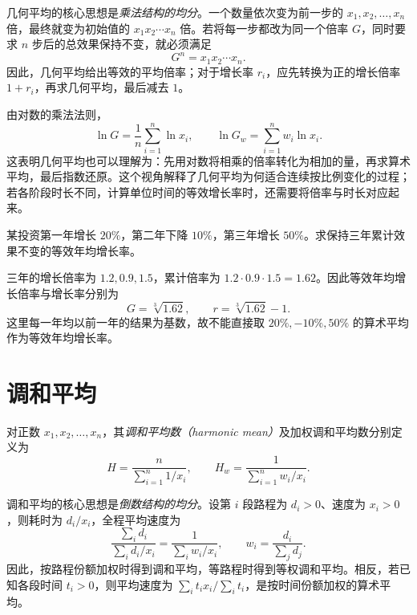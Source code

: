 \documentclass[UTF8,12pt,a4paper,fontset=fandol]{ctexart}
\begin{document}
几何平均的核心思想是\emph{乘法结构的均分}。一个数量依次变为前一步的 $x_1,x_2,\ldots,x_n$ 倍，最终就变为初始值的 $x_1x_2\cdots x_n$ 倍。若将每一步都改为同一个倍率 $G$，同时要求 $n$ 步后的总效果保持不变，就必须满足
\[
  G^n=x_1x_2\cdots x_n.
\]
因此，几何平均给出等效的平均倍率；对于增长率 $r_i$，应先转换为正的增长倍率 $1+r_i$，再求几何平均，最后减去 $1$。

由对数的乘法法则，
\begin{equation}
\label{eq:means-geometric-log}
  \ln G=\frac{1}{n}\sum_{i=1}^n\ln x_i,
  \qquad \ln G_w=\sum_{i=1}^n w_i\ln x_i.
\end{equation}
这表明几何平均也可以理解为：先用对数将相乘的倍率转化为相加的量，再求算术平均，最后指数还原。这个视角解释了几何平均为何适合连续按比例变化的过程；若各阶段时长不同，计算单位时间的等效增长率时，还需要将倍率与时长对应起来。

\begin{example}
某投资第一年增长 $20\%$，第二年下降 $10\%$，第三年增长 $50\%$。求保持三年累计效果不变的等效年均增长率。
\end{example}

\begin{solve}
三年的增长倍率为 $1.2,0.9,1.5$，累计倍率为 $1.2\cdot0.9\cdot1.5=1.62$。因此等效年均增长倍率与增长率分别为
\[
  G=\sqrt[3]{1.62},
  \qquad r=\sqrt[3]{1.62}-1.
\]
这里每一年均以前一年的结果为基数，故不能直接取 $20\%,-10\%,50\%$ 的算术平均作为等效年均增长率。
\end{solve}

\section{调和平均}
\label{sec:means-harmonic}

\begin{definition}
对正数 $x_1,x_2,\ldots,x_n$，其\emph{调和平均数（harmonic mean）}及加权调和平均数分别定义为
\begin{equation}
\label{eq:means-harmonic}
  H=\frac{n}{\sum_{i=1}^n1/x_i},
  \qquad H_w=\frac{1}{\sum_{i=1}^n w_i/x_i}.
\end{equation}
\end{definition}

调和平均的核心思想是\emph{倒数结构的均分}。设第 $i$ 段路程为 $d_i>0$、速度为 $x_i>0$，则耗时为 $d_i/x_i$，全程平均速度为
\[
  \frac{\sum_i d_i}{\sum_i d_i/x_i}
  =\frac{1}{\sum_i w_i/x_i},
  \qquad w_i=\frac{d_i}{\sum_jd_j}.
\]
因此，按路程份额加权时得到调和平均，等路程时得到等权调和平均。相反，若已知各段时间 $t_i>0$，则平均速度为 $\sum_it_ix_i/\sum_it_i$，是按时间份额加权的算术平均。
\end{document}
